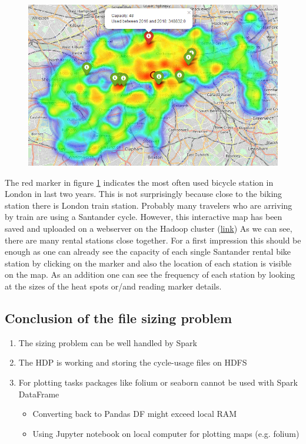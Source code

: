 \documentclass[12pt]{article}
\begin{document}
\begin{figure}[H]
\hspace{-0.8cm}
\includegraphics[width=1.1\textwidth]{img/heat}\label{pic:heat}
\label{pic:heat}
\end{figure}
\noindent 
The red marker in figure \ref{pic:heat} indicates the most often used bicycle station in London in last two years. This is not surprisingly because close to the biking station there is London train station. Probably many travelers who are arriving by train are using a Santander cycle. However, this interactive map has been saved and uploaded on a webserver on the Hadoop cluster (\href{http://i-hadoop-01.informatik.hs-ulm.de/most_stations.html}{link})
As we can see, there are many rental stations close together. For a first impression this should be enough
as one can already see the capacity of each single Santander rental bike station by clicking on the marker
and also the location of each station is visible on the map. As an addition one can see the frequency of
each station by looking at the sizes of the heat spots or/and reading marker details.
\subsection{Conclusion of the file sizing problem}
\begin{enumerate}
\item The sizing problem can be well handled by Spark
\item The HDP is working and storing the cycle-usage files on HDFS
\item For plotting tasks packages like folium or seaborn cannot be used with Spark DataFrame
\begin{itemize}
\item Converting back to Pandas DF might exceed local RAM
\item Using Jupyter notebook on local computer for plotting maps (e.g. folium)
\end{itemize}
\end{enumerate}
\end{document}
